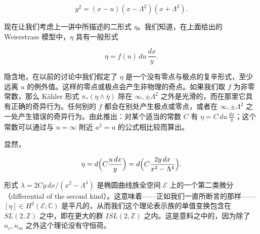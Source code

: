 \[
  y^2=(x-u)(x-\Lambda^2)(x+\Lambda^2).
\]

现在让我们考虑上一讲中所描述的二形式 $\eta$。我们知道，在上面给出的 Weierstrass 模型中，$\eta$ 具有一般形式

\[
  \eta=f(u)\,du\,\frac{dx}{y}.
\]

隐含地，在以前的讨论中我们假定了 $\eta$ 是一个没有零点与极点的复辛形式，至少远离 $u$ 的例外值。这样的零点或极点会产生非物理的奇点。如果我们取 $f$ 为非零常数，那么 Kähler 形式 $\pi_*(\eta\wedge\bar\eta)$ 除在 $\infty,\pm\Lambda^2$ 之外是光滑的，而在那里它具有正确的奇异行为。任何别的 $f$ 都会在别处产生极点或零点，或者在 $\infty,\pm\Lambda^2$ 之一处产生错误的奇异行为。由此推出：对某个适当的常数 $C$ 有 $\eta=C\,du\,\frac{dx}{y}$；这个常数可以通过与 $u=\infty$ 附近 $a^2=u$ 的公式相比较而算出。

显然，

\[
  \eta=d\Bigl(C\frac{u\,dx}{y}\Bigr)=d\Bigl(C\frac{2y\,dx}{x^2-\Lambda^4}\Bigr).
\]

形式 $\lambda=2Cy\,dx/(x^2-\Lambda^4)$ 是椭圆曲线族全空间 $\mathcal{E}$ 上的一个第二类微分（differential of the second kind）。这意味着——正如我们一直所断言的那样——$[\eta]\in H^2(\mathcal{E};\mathbb{C})$ 是平凡的，从而我们这个理论表示族的单值变换包含在 $SL(2,\mathbb{Z})$ 之中，即在更大的群 $ISL(2,\mathbb{Z})$ 之内。这是意料之中的，因为除了 $n_e,n_m$ 之外这个理论没有守恒荷。

%

